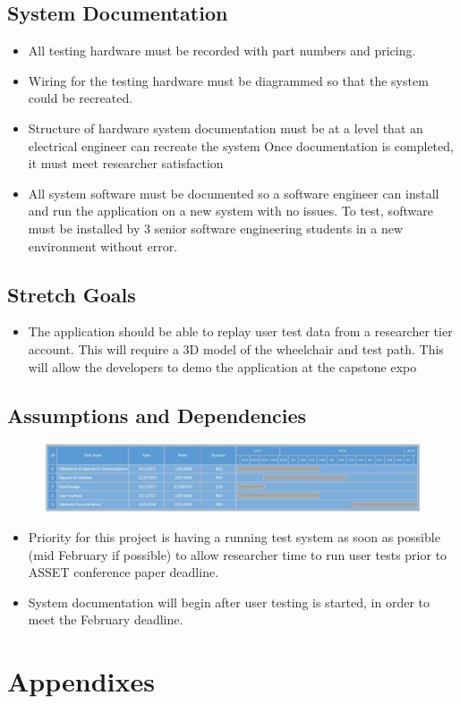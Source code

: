 \documentclass[onecolumn, draftclsnofoot,10pt, compsoc]{IEEEtran}
\begin{document}
\subsection{System Documentation}
\begin{itemize}
	\item All testing hardware must be recorded with part numbers and pricing.
	\item Wiring for the testing hardware must be diagrammed so that the system could be recreated. 
	\item Structure of hardware system documentation must be at a level that an electrical engineer can recreate the system
		\subitem Once documentation is completed, it must meet researcher satisfaction
	\item All system software must be documented so a software engineer can install and run the application on a new system with no issues. 
		\subitem To test, software must be installed by 3 senior software engineering students in a new environment without error. 
\end{itemize}
\subsection{Stretch Goals}
\begin{itemize}
	\item The application should be able to replay user test data from a researcher tier account.
	\subitem This will require a 3D model of the wheelchair and test path.
	\subitem This will allow the developers to demo the application at the capstone expo
\end{itemize}
\subsection{Assumptions and Dependencies}
\begin{figure}[h!]
	\centering
	\includegraphics[width=\linewidth, scale=0.7]{PrelimGanttChart.jpg}
\end{figure}
\begin{itemize}
	\item Priority for this project is having a running test system as soon as possible (mid February if possible) to allow researcher time to run user tests prior to ASSET conference paper deadline. 
	\item System documentation will begin after user testing is started, in order to meet the February deadline. 
\end{itemize}

\section{Appendixes}
\end{document}
